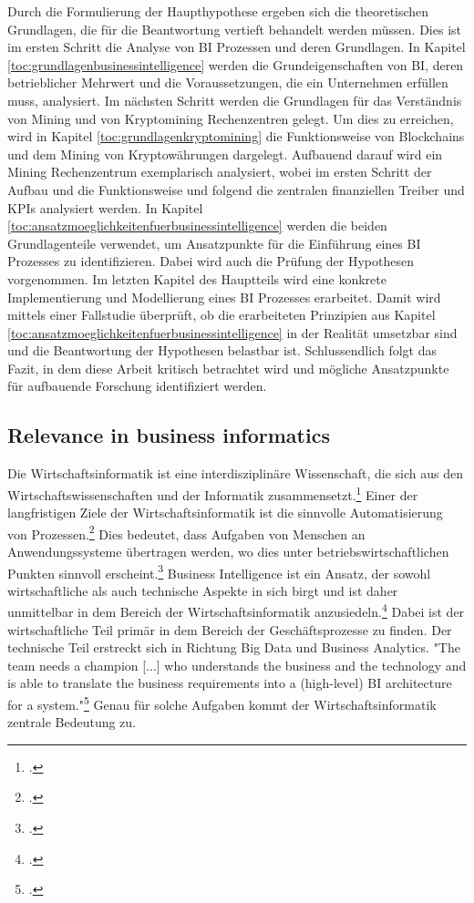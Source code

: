Durch die Formulierung der Haupthypothese ergeben sich die theoretischen Grundlagen, die für die Beantwortung vertieft behandelt werden müssen.
Dies ist im ersten Schritt die Analyse von \ac{BI} Prozessen und deren Grundlagen. In Kapitel \ref{toc:grundlagenbusinessintelligence}
werden die Grundeigenschaften von \ac{BI}, deren betrieblicher Mehrwert und die Voraussetzungen, die ein Unternehmen erfüllen muss, analysiert.
Im nächsten Schritt werden die Grundlagen für das Verständnis von Mining und von Kryptomining Rechenzentren gelegt. Um dies zu erreichen, wird
in Kapitel \ref{toc:grundlagenkryptomining} die Funktionsweise von Blockchains und dem Mining von Kryptowährungen dargelegt. Aufbauend darauf
wird ein Mining Rechenzentrum exemplarisch analysiert, wobei im ersten Schritt der Aufbau und die Funktionsweise und folgend die zentralen
finanziellen Treiber und \acp{KPI} analysiert werden. In Kapitel \ref{toc:ansatzmoeglichkeitenfuerbusinessintelligence} werden die beiden
Grundlagenteile verwendet, um Ansatzpunkte für die Einführung eines \ac{BI} Prozesses zu identifizieren. Dabei wird auch die Prüfung der
Hypothesen vorgenommen. Im letzten Kapitel des Hauptteils wird eine konkrete Implementierung und Modellierung eines \ac{BI} Prozesses
erarbeitet. Damit wird mittels einer Fallstudie überprüft, ob die erarbeiteten Prinzipien aus Kapitel
\ref{toc:ansatzmoeglichkeitenfuerbusinessintelligence} in der Realität umsetzbar sind und die Beantwortung der Hypothesen belastbar ist.
Schlussendlich folgt das Fazit, in dem diese Arbeit kritisch betrachtet wird und mögliche Ansatzpunkte für aufbauende Forschung identifiziert
werden.

\subsection{Relevance in business informatics} \label{toc:relevanzinderwirtschaftinformatik}

Die Wirtschaftsinformatik ist eine interdisziplinäre Wissenschaft, die sich aus den Wirtschaftswissenschaften und der Informatik
zusammensetzt.\footcite[Cf.][p. 5]{mertens2005grundzuge} Einer der langfristigen Ziele der Wirtschaftsinformatik ist die sinnvolle
Automatisierung von Prozessen.\footcite[Cf.][S. 4]{mertens2005grundzuge} Dies bedeutet, dass Aufgaben von Menschen an Anwendungssysteme
übertragen werden, wo dies unter betriebswirtschaftlichen Punkten sinnvoll erscheint.\footcite[Cf.][p. 4]{mertens2005grundzuge}
Business Intelligence ist ein Ansatz, der sowohl wirtschaftliche als auch technische Aspekte in sich birgt und ist daher unmittelbar
in dem Bereich der Wirtschaftsinformatik anzusiedeln.\footcite[Cf.][p. 102]{azma2012business} Dabei ist der wirtschaftliche Teil primär
in dem Bereich der Geschäftsprozesse zu finden. Der technische Teil erstreckt sich in Richtung Big Data und Business Analytics. "The
team needs a champion [...] who understands the business and the technology and is able to translate the business requirements into a
(high-level) BI architecture for a system."\footcite[][p. 27]{yeoh2010critical} Genau für solche Aufgaben kommt der Wirtschaftsinformatik
zentrale Bedeutung zu.

